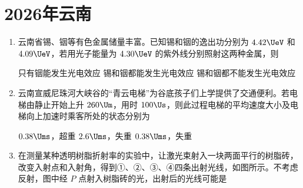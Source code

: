 \documentclass[\gkver]{gaokaozhenti}
\begin{document}
\chapter{2026年云南}
\begin{enumerate}
\item
云南省锡、铟等有色金属储量丰富。已知锡和铟的逸出功分别为 $ 4.42 \UeV $ 和 $ 4.09 \UeV $，若用光子能量为 $ 4.30 \UeV $ 的紫外线分别照射这两种金属，则 


{只有铟能发生光电效应}
{锡和铟都能发生光电效应}
{锡和铟都不能发生光电效应}


\item
云南宣威尼珠河大峡谷的“青云电梯”为谷底孩子们上学提供了交通便利。若电梯由静止开始上升 $ 260 \Um $，用时 $ 100 \Us $，则此过程电梯的平均速度大小及电梯向上加速时乘客所处的状态分别为 


{$ 0.38 \Ums $，超重}
{$ 2.6 \Ums $，失重}
{$ 0.38 \Ums $，失重}


\item
在测量某种透明树脂折射率的实验中，让激光束射入一块两面平行的树脂砖，改变入射点和入射角，得到①、②、③、④四条出射光线，如图所示。不考虑反射，图中经 $ P $ 点射入树脂砖的光，出射后的光线可能是 
\onepicture[w=5.79cm]{}


\end{enumerate}
\end{document}
